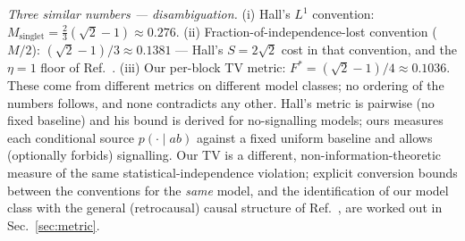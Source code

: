 \documentclass[aps,pra,reprint,superscriptaddress,floatfix]{revtex4-2}
\begin{document}
\emph{Three similar numbers --- disambiguation.} (i) Hall's $L^1$ convention:
$M_{\mathrm{singlet}}=\tfrac23(\sqrt2-1)\approx\mathbf{0.276}$.
(ii) Fraction-of-independence-lost convention ($M/2$):
$(\sqrt2-1)/3\approx\mathbf{0.1381}$ --- Hall's $S=2\sqrt2$ cost in that
convention, and the $\eta=1$ floor of Ref.~.
(iii) Our per-block TV metric: $F^*=(\sqrt2-1)/4\approx\mathbf{0.1036}$.
These come from different metrics on different model classes; no ordering of
the numbers follows, and none contradicts any other. Hall's metric is
pairwise (no fixed baseline) and his bound is derived for no-signalling
models; ours measures each conditional source $p(\cdot\mid ab)$ against a
fixed uniform baseline and allows (optionally forbids) signalling. Our TV is a different,
non-information-theoretic measure of the same statistical-independence
violation; explicit conversion bounds between the conventions for the
\emph{same} model, and the identification of our model class with the
general (retrocausal) causal structure of
Ref.~, are worked out in
Sec.~\ref{sec:metric}.
\end{document}
